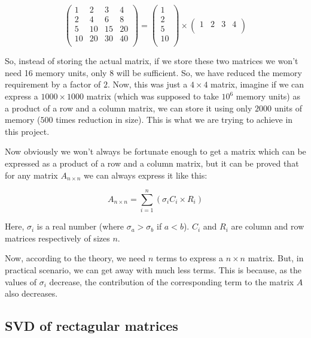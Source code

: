 		$$
		\left(
		\begin{matrix}
			1 & 2 & 3 & 4\\
			2 & 4 & 6 & 8\\
			5 & 10 & 15 & 20\\
			10 & 20 & 30 & 40\\
		\end{matrix}
		\right)=
		\left(
			\begin{matrix}
				1\\
				2\\
				5\\
				10\\
			\end{matrix}
		\right)\times
		\left(
			\begin{matrix}
				1 & 2 & 3 & 4\\
			\end{matrix}
		\right)
		$$

		So, instead of storing the actual matrix, if we store these two matrices we won't need 16 memory units, only $8$ will be sufficient. So, we have reduced the memory requirement by a factor of $2$. Now, this was just a $4\times4$ matrix, imagine if we can express a $1000\times1000$ matrix (which was supposed to take $10^6$ memory units) as a product of a row and a column matrix, we can store it using only $2000$ units of memory ($500$ times reduction in size). This is what we are trying to achieve in this project.

		Now obviously we won't always be fortunate enough to get a matrix which can be expressed as a product of a row and a column matrix, but it can be proved that for any matrix $A_{n\times n}$ we can always express it like this:

		$$A_{n\times n} = \sum_{i=1}^n (\sigma_iC_i\times R_i)$$

		Here, $\sigma_i$ is a real number (where $\sigma_a>\sigma_b$ if $a<b$). $C_i$ and $R_i$ are column and row matrices respectively of sizes $n$.

		Now, according to the theory, we need $n$ terms to express a $n\times n$ matrix. But, in practical scenario, we can get away with much less terms. This is because, as the values of $\sigma_i$ decrease, the contribution of the corresponding term to the matrix $A$ also decreases.

	\subsection{SVD of rectagular matrices}


